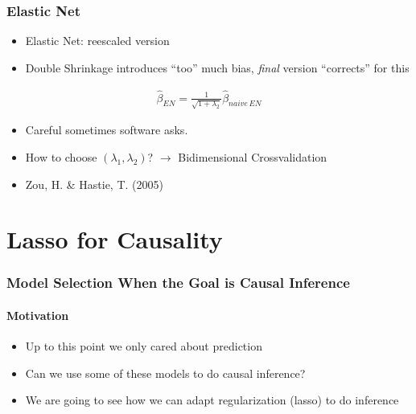 \documentclass[
  shownotes,
  xcolor={svgnames},
  hyperref={colorlinks,citecolor=DarkBlue,linkcolor=DarkRed,urlcolor=DarkBlue}
  , aspectratio=169]{beamer}
\begin{document}
\begin{frame}[fragile]
\frametitle{Elastic Net}

\begin{itemize}
\item Elastic Net: reescaled version
\item Double Shrinkage introduces ``too'' much bias, {\it final} version ``corrects'' for this
\end{itemize}
\bigskip
\begin{align}
\hat{\beta}_{EN}= \frac{1}{\sqrt{1+\lambda_2}}\hat{\beta}_{naive\,EN}
\end{align}
\bigskip
\begin{itemize}
  \item Careful sometimes software asks.
  \item How to choose $(\lambda_1,\lambda_2)$? $\rightarrow$ Bidimensional Crossvalidation
  \item Zou, H. \& Hastie, T. (2005)
\end{itemize}

\end{frame}

\section{Lasso for Causality}
\begin{frame}[fragile]
\frametitle{Model Selection When the Goal is Causal Inference}
\framesubtitle{Motivation}


\begin{itemize}
\item Up to this point we only cared about prediction
\medskip
\item Can we use some of these models to do causal inference?
\medskip

\item We are going to see how we can adapt regularization (lasso) to do inference
\end{itemize}

\end{frame}
\end{document}
